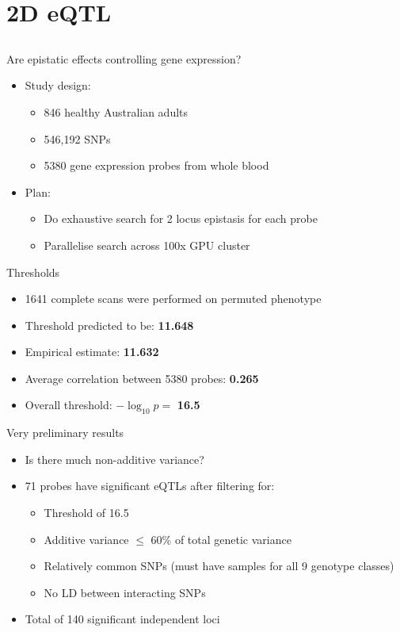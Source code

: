 \documentclass{beamer}
\begin{document}
\section{2D eQTL}
\subsection{}

\begin{frame}{Are epistatic effects controlling gene expression?}
\begin{itemize}
\item Study design:
\begin{itemize}
\item 846 healthy Australian adults
\item 546,192 SNPs
\item 5380 gene expression probes from whole blood
\end{itemize}
\item Plan:
\begin{itemize}
\item Do exhaustive search for 2 locus epistasis for each probe
\item Parallelise search across 100x GPU cluster
\end{itemize}
\end{itemize}
\end{frame}

\begin{frame}{Thresholds}
\begin{itemize}
\item 1641 complete scans were performed on permuted phenotype
\item Threshold predicted to be: \textbf{11.648}
\item Empirical estimate: \textbf{11.632}
\item Average correlation between 5380 probes: \textbf{0.265}
\item Overall threshold: $-\log_{10}p =$ \textbf{16.5}
\end{itemize}
\end{frame}

\begin{frame}{Very preliminary results}
\begin{itemize}
\item Is there much non-additive variance?
\item 71 probes have significant eQTLs after filtering for:
\begin{itemize}
\item Threshold of 16.5
\item Additive variance $\leq$ 60\% of total genetic variance
\item Relatively common SNPs (must have samples for all 9 genotype classes)
\item No LD between interacting SNPs
\end{itemize}
\item Total of 140 significant independent loci
\end{itemize}
\end{frame}
\end{document}
